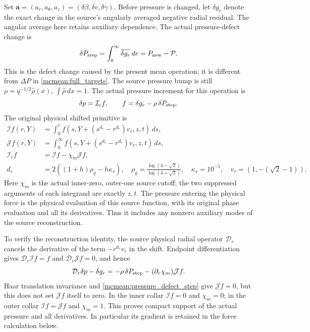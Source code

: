 \documentclass[11pt]{article}
\begin{document}
Set \(\boldsymbol a=(a_r,a_\theta,a_z)
=(\delta\beta,\delta v,\delta\gamma)\). Before pressure is
changed, let \(\delta g_r\) denote the exact change in the source's
angularly averaged negative radial residual. The angular average here
retains auxiliary dependence. The actual pressure-defect change is
\begin{equation}\label{mcmean:pressure_defect_step}
 \delta P_{\rm step}=\int_0^\infty\overline{\delta g_r}\,dr
                    =P_{\rm new}-\mathcal P.
\end{equation}
This is the defect change caused by the present mean operation;
it is different from \(\Delta P\) in \eqref{mcmean:full_targets}.
The source pressure bump is still
\(\rho=q^{-1/2}\widehat\rho(x)\),
\(\int\widehat\rho\,dx=1\). The actual pressure increment for this
operation is
\begin{equation}\label{mcmean:actual_pressure}
 \delta p=\mathcal I_c f,\qquad
 f=\delta g_r-\rho\,\delta P_{\rm step}.
\end{equation}
The original physical shifted primitive is
\[
\begin{split}
 \mathcal If(r,Y)&=\int_0^r
  f(s,Y+(s^{d_r}-r^{d_r})v_r,z,t)\,ds,\\
 \mathcal Jf(r,Y)&=\int_0^\infty
  f(s,Y+(s^{d_r}-r^{d_r})v_r,z,t)\,ds,\\
 \mathcal I_cf&=\mathcal If-\chi_m\mathcal Jf,\\
 d_r&=2((1+h)\rho_g-h\kappa_s),\quad
 \rho_g=\frac{\log(4-\sqrt2)}{\log(4+\sqrt2)},\quad
 \kappa_s=10^{-5},\quad v_r=(1,-(\sqrt2-1)).
\end{split}
\]
Here \(\chi_m\) is the actual inner-zero, outer-one source cutoff;
the two suppressed arguments of each integrand are exactly \(z,t\).
The pressure entering the physical force is the physical evaluation of
this source function, with its original phase evaluation and all its
derivatives. Thus it includes any nonzero auxiliary modes of the
source reconstruction.

To verify the reconstruction identity, the source physical radial
operator \(\mathcal D_r\) cancels the derivative of the term
\(-r^{d_r}v_r\) in the shift. Endpoint differentiation gives
\(\mathcal D_r\mathcal If=f\) and
\(\mathcal D_r\mathcal Jf=0\), and hence
\begin{equation}\label{mcmean:pressure_remainder}
 \mathcal D_r\delta p-\delta g_r
 =-\rho\,\delta P_{\rm step}
                  -(\partial_r\chi_m)\mathcal Jf.
\end{equation}
Haar translation invariance and \eqref{mcmean:pressure_defect_step}
give \(\overline{\mathcal Jf}=0\), but this does not set
\(\mathcal Jf\) itself to zero. In the inner collar \(\mathcal If=0\)
and \(\chi_m=0\); in the outer collar \(\mathcal If=\mathcal Jf\)
and \(\chi_m=1\). This proves compact support of the actual pressure
and all derivatives. In particular its gradient is retained in the
force calculation below.
\end{document}
